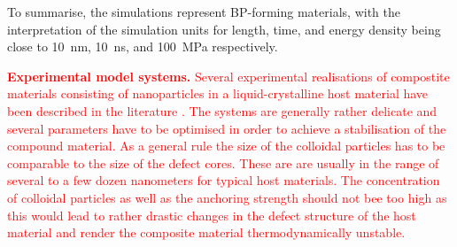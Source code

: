 \documentclass[12pt]{article}
\begin{document}
To summarise, the simulations represent BP-forming materials, with the
interpretation of the simulation units for length, time, and energy
density being close to 10~nm, 10~ns, and 100~MPa respectively.

\medskip
\noindent
\textcolor{red}{
\textbf{Experimental model systems.}
Several experimental realisations of compostite
materials consisting of nanoparticles in a liquid-crystalline 
host material have been described in the literature 
\cite{karatairi, rozic, dierking, cordoyiannis}. 
The systems are generally rather delicate and several
parameters have to be optimised in order to achieve a stabilisation 
of the compound material. As a general rule the
size of the colloidal particles has to be comparable to the size 
of the defect cores. These are are usually in the range of several
to a few dozen nanometers for typical host materials.
The concentration of colloidal particles as well as the anchoring 
strength should not bee too high as this would lead to rather 
drastic changes in the defect structure 
of the host material and render the composite material 
thermodynamically unstable. 
}

\pagebreak
\end{document}
